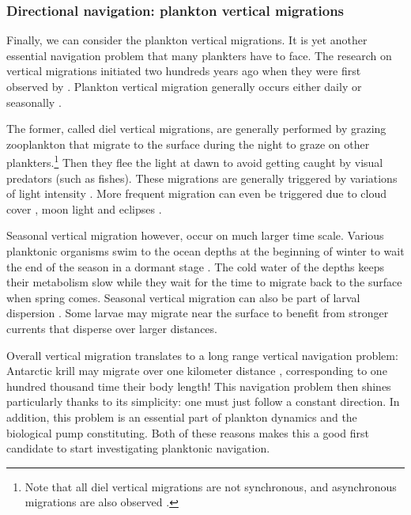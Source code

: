 \subsubsection{Directional navigation: plankton vertical migrations}

Finally, we can consider the plankton vertical migrations.
It is yet another essential navigation problem that many plankters have to face.
The research on vertical migrations initiated two hundreds years ago when they were first observed by \citet{cuvier1817regne}.
Plankton vertical migration generally occurs either daily or seasonally \citep{bandara2021two}.

The former, called diel vertical migrations, are generally performed by grazing zooplankton that migrate to the surface during the night to graze on other plankters.\footnote{Note that all diel vertical migrations are not synchronous, and asynchronous migrations are also observed \citep{cottier2006unsynchronised}.}
Then they flee the light at dawn to avoid getting caught by visual predators (such as fishes).
These migrations are generally triggered by variations of light intensity \citep{richards1996diel, van2013diel}. 
More frequent migration can even be triggered due to cloud cover \citep{omand2021cloud}, moon light \citep{last2016moonlight} and eclipses \citep{adhikari2018effect}.

Seasonal vertical migration however, occur on much larger time scale.
Various planktonic organisms swim to the ocean depths at the beginning of winter to wait the end of the season in a dormant stage \citep{naess1991diapausing, kaartvedt1996habitat}.
The cold water of the depths keeps their metabolism slow while they wait for the time to migrate back to the surface when spring comes.
Seasonal vertical migration can also be part of larval dispersion \citep{mcmanus2012plankton, kim1994larval, vikebo2007drift}.
Some larvae may migrate near the surface to benefit from stronger currents that disperse over larger distances.

Overall vertical migration translates to a long range vertical navigation problem: Antarctic krill may migrate over one kilometer distance \citep{hamner1983behavior}, corresponding to one hundred thousand time their body length!
This navigation problem then shines particularly thanks to its simplicity: one must just follow a constant direction.
In addition, this problem is an essential part of plankton dynamics and the biological pump constituting.
Both of these reasons makes this a good first candidate to start investigating planktonic navigation.

